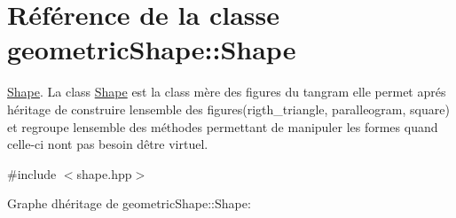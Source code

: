\hypertarget{classgeometric_shape_1_1_shape}{}\section{Référence de la classe geometric\+Shape\+:\+:Shape}
\label{classgeometric_shape_1_1_shape}


\hyperlink{classgeometric_shape_1_1_shape}{Shape}. La class \hyperlink{classgeometric_shape_1_1_shape}{Shape} est la class mère des figures du tangram elle permet aprés héritage de construire l\textquotesingle{}ensemble des figures(rigth\+\_\+triangle, paralleogram, square) et regroupe l\textquotesingle{}ensemble des méthodes permettant de manipuler les formes quand celle-\/ci n\textquotesingle{}ont pas besoin d\textquotesingle{}être virtuel.  




{\ttfamily \#include $<$shape.\+hpp$>$}



Graphe d\textquotesingle{}héritage de geometric\+Shape\+:\+:Shape\+:
